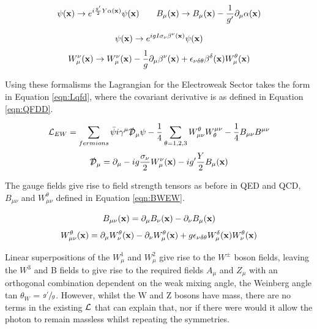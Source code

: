 \begin{equation}
\psi(\mathbf{x}) \rightarrow e^{i\frac{g'}{2}Y\alpha (\mathbf{x})}\psi(\mathbf{x}) \qquad B_{\mu}(\mathbf{x}) \rightarrow B_{\mu}(\mathbf{x}) - \frac{1}{g'}\partial_{\mu}\alpha(\mathbf{x})
\label{eqn:ewu1}
\end{equation}

\begin{equation}
\psi(\mathbf{x}) \rightarrow e^{igI\sigma_{\nu} \beta^{\nu} (\mathbf{x})}\psi(\mathbf{x})
\label{eqn:ewsu2}
\end{equation}
\begin{equation}
W_{\mu}^{\nu}(\mathbf{x}) \rightarrow W_{\mu}^{\nu}(\mathbf{x}) - \frac{1}{g}\partial_{\mu}\beta^{\nu}(\mathbf{x}) + \epsilon_{\nu \delta \theta}\beta^{\delta}(\mathbf{x})W_{\mu}^{\theta}(\mathbf{x})
\label{eqn:ewsu3}
\end{equation}

Using these formalisms the Lagrangian for the Electroweak Sector takes the form in Equation \ref{eqn:Lqfd}, where the covariant derivative is as defined in Equation \ref{eqn:QFDD}. 

\begin{equation}
{\mathcal{L}}_{EW} = \sum_{fermions} \bar{\psi}i\gamma^{\mu}\slashed{\mathcal{D}}_{\mu}\psi - \frac{1}{4}\sum_{\theta = 1,2,3} W^{\theta}_{\mu\nu}W_{\theta}^{\mu\nu} - \frac{1}{4}B_{\mu\nu}B^{\mu\nu}
\label{eqn:Lqfd}
\end{equation}
\begin{equation}
\slashed{\mathcal{D}}_{\mu} = \partial_{\mu}-ig\frac{\sigma_{\nu}}{2}W_{\mu}^{\nu}(\mathbf{x}) - ig'\frac{Y}{2}B_{\mu}(\mathbf{x})
\label{eqn:QFDD}
\end{equation}

The gauge fields give rise to field strength tensors as before in QED and QCD, $B_{\mu\nu}$ and $W_{\mu\nu}^{\theta}$ defined in Equation \ref{eqn:BWEW}. 

\begin{equation}
B_{\mu\nu}(\mathbf{x}) = \partial_{\mu}B_{\nu}(\mathbf{x}) - \partial_{\nu}B_{\mu}(\mathbf{x})
\end{equation}
\begin{equation}
W_{\mu\nu}^{\theta}(\mathbf{x}) = \partial_{\mu}W_{\nu}^{\theta}(\mathbf{x}) - \partial_{\nu}W_{\mu}^{\theta}(\mathbf{x}) + g\epsilon_{\nu \delta \theta}W_{\mu}^{\delta}(\mathbf{x})W_{\nu}^{\theta}(\mathbf{x})
\label{eqn:BWEW}
\end{equation}

Linear superpositions of the $W^{1}_{\mu}$ and $W^{2}_{\mu}$ give rise to the $W^{\pm}$ boson fields, leaving the $W^{3}$ and B fields to give rise to the required fields $A_{\mu}$ and $Z_{\mu}$ with an orthogonal combination dependent on the weak mixing angle, the Weinberg angle tan $\theta_{W}$ = $\sfrac{g'}{g}$. However, whilst the W and Z bosons have mass, there are no terms in the existing ${\mathcal{L}}$ that can explain that, nor if there were would it allow the photon to remain massless whilst repeating the symmetries. 


